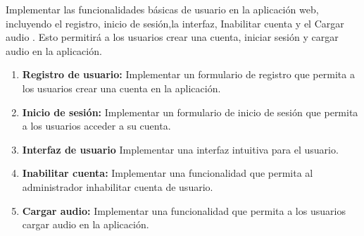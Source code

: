 \begin{doublespace}
    Implementar las funcionalidades básicas de usuario en la aplicación
    web, incluyendo el registro, inicio de sesión,la interfaz, Inabilitar cuenta y el Cargar audio
    . Esto permitirá a los usuarios crear una cuenta, iniciar sesión y cargar audio en la aplicación.
    \begin{enumerate}
        \item \textbf{Registro de usuario:} Implementar un formulario de registro que permita a los
                usuarios crear una cuenta en la aplicación.
        \item \textbf{Inicio de sesión:} Implementar un formulario de inicio de sesión que permita a
                los usuarios acceder a su cuenta.
        \item \textbf{Interfaz de usuario } Implementar una interfaz intuitiva para el usuario.
        \item \textbf{Inabilitar cuenta:} Implementar una funcionalidad que permita al administrador
                inhabilitar cuenta de usuario.
        \item \textbf{Cargar audio:} Implementar una funcionalidad que permita a los usuarios cargar
                audio en la aplicación.
    \end{enumerate}

\end{doublespace}
